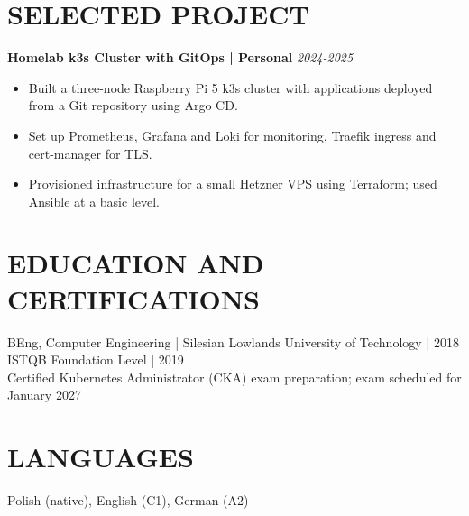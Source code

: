\documentclass[11pt,a4paper]{article}
\begin{document}
\section*{SELECTED PROJECT}
\textbf{Homelab k3s Cluster with GitOps | Personal} \hfill \textit{2024-2025}
\begin{itemize}
\item Built a three-node Raspberry Pi 5 k3s cluster with applications deployed from a Git repository using Argo CD.
\item Set up Prometheus, Grafana and Loki for monitoring, Traefik ingress and cert-manager for TLS.
\item Provisioned infrastructure for a small Hetzner VPS using Terraform; used Ansible at a basic level.
\end{itemize}

\section*{EDUCATION AND CERTIFICATIONS}
BEng, Computer Engineering | Silesian Lowlands University of Technology | 2018\\
ISTQB Foundation Level | 2019\\
Certified Kubernetes Administrator (CKA) exam preparation; exam scheduled for January 2027

\section*{LANGUAGES}
Polish (native), English (C1), German (A2)
\end{document}

